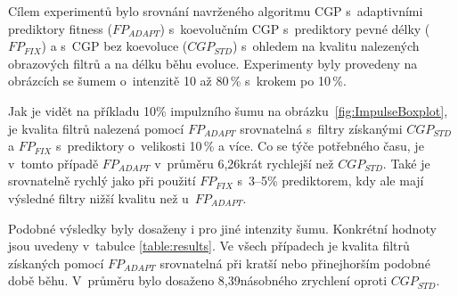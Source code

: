 \documentclass[czech]{ExcelAtFIT} %
\begin{document}
Cílem experimentů bylo srovnání navrženého algoritmu CGP s~adaptivními prediktory fitness ($\mathit{FP_{ADAPT}}$) s~koevolučním CGP s~prediktory pevné délky ($\mathit{FP_{FIX}}$) a s~CGP bez koevoluce ($\mathit{CGP_{STD}}$) s~ohledem na kvalitu nalezených obrazových filtrů a na délku běhu evoluce. Experimenty byly provedeny na obrázcích se šumem o~intenzitě 10 až 80\,\% s~krokem po 10\,\%.

Jak je vidět na příkladu 10\% impulzního šumu na obrázku~\ref{fig:ImpulseBoxplot}, je kvalita filtrů nalezená pomocí $\mathit{FP_{ADAPT}}$ srovnatelná s~filtry získanými $\mathit{CGP_{STD}}$ a $\mathit{FP_{FIX}}$ s~pre\-dik\-tory o~velikosti 10\,\% a více. Co se týče potřebného času, je v~tomto případě $\mathit{FP_{ADAPT}}$ v~průměru 6,26krát rychlejší než $\mathit{CGP_{STD}}$. Také je srovnatelně rychlý jako při použití $\mathit{FP_{FIX}}$ s~3--5\% pre\-dik\-to\-rem, kdy ale mají výsledné filtry nižší kvalitu než u~$\mathit{FP_{ADAPT}}$.

Podobné výsledky byly dosaženy i pro jiné in\-ten\-zity šumu. Konkrétní hodnoty jsou uvedeny v~tabulce \ref{table:results}. Ve všech případech je kvalita filtrů získaných pomocí $\mathit{FP_{ADAPT}}$ srovnatelná při kratší nebo přinejhorším podobné době běhu. V~průměru bylo dosaženo 8,39násobného zrychlení oproti $\mathit{CGP_{STD}}$.
\end{document}
